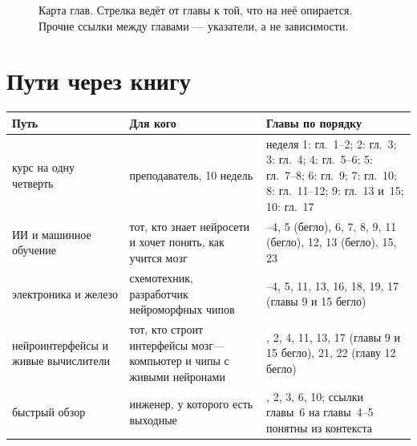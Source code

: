 \begin{figure}[h]
\caption{Карта глав. Стрелка ведёт от главы к той, что на неё опирается. Прочие ссылки между главами --- указатели, а не зависимости.}
\label{fig:roadmap}
\end{figure}

\section*{Пути через книгу}

\begin{center}
\footnotesize
\setlength{\tabcolsep}{4pt}
\renewcommand{\arraystretch}{1.2}
\begin{tabular}{>{\raggedright}p{3.0cm}>{\raggedright}p{3.9cm}>{\raggedright\arraybackslash}p{6.4cm}}
\toprule
Путь & Для кого & Главы по порядку \\
\midrule
курс на одну четверть & преподаватель, 10 недель & неделя 1: гл.~1--2; 2: гл.~3; 3: гл.~4; 4: гл.~5--6; 5: гл.~7--8; 6: гл.~9; 7: гл.~10; 8: гл.~11--12; 9: гл.~13 и~15; 10: гл.~17 \\
ИИ и машинное обучение & тот, кто знает нейросети и хочет понять, как учится мозг & 1--4, 5 (бегло), 6, 7, 8, 9, 11 (бегло), 12, 13 (бегло), 15, 23 \\
электроника и железо & схемотехник, разработчик нейроморфных чипов & 1--4, 5, 11, 13, 16, 18, 19, 17 (главы 9 и 15 бегло) \\
нейроинтерфейсы и живые вычислители & тот, кто строит интерфейсы мозг---компьютер и чипы с живыми нейронами & 1, 2, 4, 11, 13, 17 (главы 9 и 15 бегло), 21, 22 (главу 12 бегло) \\
быстрый обзор & инженер, у которого есть выходные & 1, 2, 3, 6, 10; ссылки главы~6 на главы~4--5 понятны из контекста \\
\bottomrule
\end{tabular}
\end{center}

